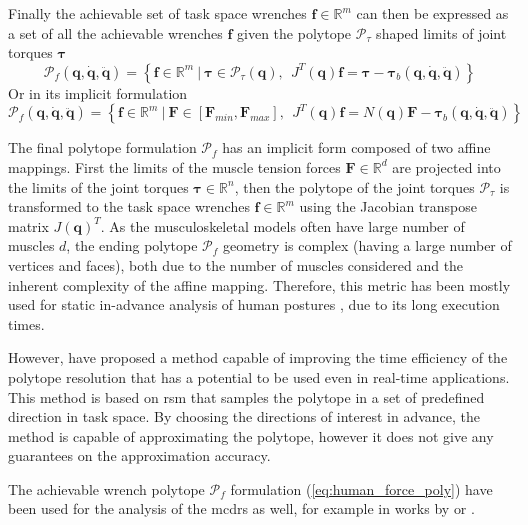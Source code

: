 Finally the achievable set of task space wrenches $\bm{f}\in\mathbb{R}^m$ can then be expressed as a set of all the achievable wrenches $\bm{f}$ given the polytope $\mathcal{P}_\tau$ shaped limits of joint torques $\bm{\tau}$
\begin{equation}
    \mathcal{P}_f(\bm{q},\dot{\bm{q}},\ddot{\bm{q}}) = \left\{ \bm{f} \in \mathbb{R}^m ~|~ \bm{\tau}\in \mathcal{P}_\tau(\bm{q}), ~~ J^T(\bm{q})\bm{f} = \bm{\tau} -\bm{\tau}_b(\bm{q},\dot{\bm{q}},\ddot{\bm{q}}) \right\}
    \label{eq:human_force_poly_ver_poly_lim}
\end{equation}
Or in its implicit formulation
\begin{equation}
    \mathcal{P}_f(\bm{q},\dot{\bm{q}},\ddot{\bm{q}}) = \left\{ \bm{f} \in \mathbb{R}^m ~|~ \bm{F}\in\left[\bm{F}_{min}, \bm{F}_{max} \right], ~~ \!J^T(\bm{q})\bm{f} =\! N(\bm{q})\bm{F} -\bm{\tau}_b(\bm{q},\dot{\bm{q}},\ddot{\bm{q}}) \right\}
    \label{eq:human_force_poly}
\end{equation}

The final polytope formulation $\mathcal{P}_f$ has an implicit form composed of two affine mappings. First the limits of the muscle tension forces $\bm{F}\in \mathbb{R}^d$ are projected into the limits of the joint torques $\bm{\tau}\in \mathbb{R}^n$, then the polytope of the joint torques $\mathcal{P}_\tau$ is transformed to the task space wrenches $\bm{f}\in \mathbb{R}^m$ using the Jacobian transpose matrix $J(\bm{q})^T$. As the musculoskeletal models often have large number of muscles $d$, the ending polytope $\mathcal{P}_f$ geometry is complex (having a large number of vertices and faces), both due to the number of muscles considered and the inherent complexity of the affine mapping. Therefore, this metric has been mostly used for static in-advance analysis of human postures \cite{hernandez_toward_2015}, due to its long execution times. 

However, \citet{carmichael_estimating_2013, carmichael2011Towards} have proposed a method capable of improving the time efficiency of the polytope resolution that has a potential to be used even in real-time applications. This method is based on \gls{rsm} that samples the polytope in a set of predefined direction in task space. By choosing the directions of interest in advance, the method is capable of approximating the polytope, however it does not give any guarantees on the approximation accuracy.

The achievable wrench polytope $\mathcal{P}_f$ formulation (\ref{eq:human_force_poly}) have been used for the analysis of the \glspl{mcdr} as well, for example in works by \citet{sheng2020operational} or \citet{Muralidharan2022}.

